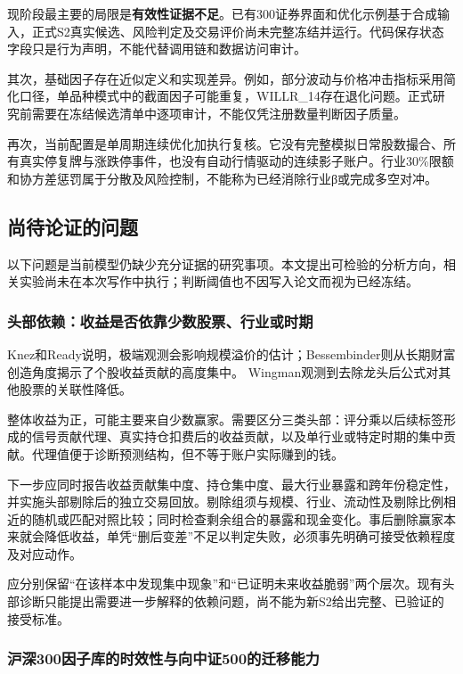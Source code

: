 \documentclass[UTF8,12pt,a4paper,fontset=none]{ctexart}
\begin{document}
现阶段最主要的局限是\textbf{有效性证据不足}。已有300证券界面和优化示例基于合成输入，正式S2真实候选、风险判定及交易评价尚未完整冻结并运行。代码保存状态字段只是行为声明，不能代替调用链和数据访问审计。


其次，基础因子存在近似定义和实现差异。例如，部分波动与价格冲击指标采用简化口径，单品种模式中的截面因子可能重复，WILLR\_14存在退化问题。正式研究前需要在冻结候选清单中逐项审计，不能仅凭注册数量判断因子质量。


再次，当前配置是单周期连续优化加执行复核。它没有完整模拟日常股数撮合、所有真实停复牌与涨跌停事件，也没有自动行情驱动的连续影子账户。行业30\%限额和协方差惩罚属于分散及风险控制，不能称为已经消除行业β或完成多空对冲。


\subsection{尚待论证的问题}

以下问题是当前模型仍缺少充分证据的研究事项。本文提出可检验的分析方向，相关实验尚未在本次写作中执行；判断阈值也不因写入论文而视为已经冻结。


\subsubsection{头部依赖：收益是否依靠少数股票、行业或时期}

Knez和Ready说明，极端观测会影响规模溢价的估计；Bessembinder则从长期财富创造角度揭示了个股收益贡献的高度集中。\cite{r6,r7} Wingman观测到去除龙头后公式对其他股票的关联性降低。


整体收益为正，可能主要来自少数赢家。需要区分三类头部：评分乘以后续标签形成的信号贡献代理、真实持仓扣费后的收益贡献，以及单行业或特定时期的集中贡献。代理值便于诊断预测结构，但不等于账户实际赚到的钱。


下一步应同时报告收益贡献集中度、持仓集中度、最大行业暴露和跨年份稳定性，并实施头部剔除后的独立交易回放。剔除组须与规模、行业、流动性及剔除比例相近的随机或匹配对照比较；同时检查剩余组合的暴露和现金变化。事后删除赢家本来就会降低收益，单凭“删后变差”不足以判定失败，必须事先明确可接受依赖程度及对应动作。


应分别保留“在该样本中发现集中现象”和“已证明未来收益脆弱”两个层次。现有头部诊断只能提出需要进一步解释的依赖问题，尚不能为新S2给出完整、已验证的接受标准。


\subsubsection{沪深300因子库的时效性与向中证500的迁移能力}
\end{document}

